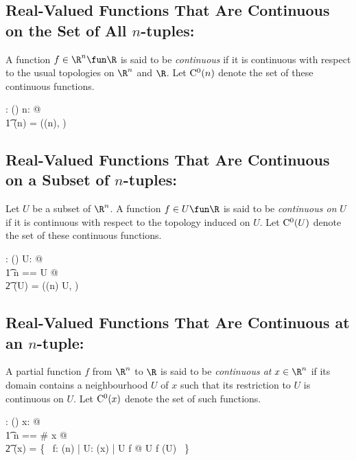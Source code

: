 \documentclass{amsart}
\begin{document}
\subsection{Real-Valued Functions That Are Continuous on the Set of All $n$-tuples: }

A function $f \in \R^n \fun \R$ is said to be \textit{continuous} if it is continuous with respect to the usual topologies
on $\R^n$ and $\R$.
Let $\operatorname{C^0}(n)$ denote the set of these continuous functions.

\begin{axdef}
	\CzeroRtup: \nat \fun \power(\Rinf \pfun \R)
\where
	\forall n: \nat @ \\
	\t1	\CzeroRtup(n) = \CzeroTT(\tsRtup(n), \Rtau)
\end{axdef}

\subsection{Real-Valued Functions That Are Continuous on a Subset of $n$-tuples: }

Let $U$ be a subset of $\R^n$.
A function $f \in U \fun \R$ is said to be \textit{continuous on} $U$
if it is continuous with respect to the topology induced on $U$.
Let $\operatorname{C^0}(U)$ denote the set of these continuous functions.

\begin{axdef}
	\CzeroSubsetRtup: \DeltaRinf \fun \power(\Rinf \pfun \R)
\where
	\forall U: \DeltaRinf @ \\
	\t1	\LET n == \dimRinf U @ \\
	\t2		\CzeroSubsetRtup(U) = \CzeroTT(\tsRtup(n) \inducedTopSp U, \Rtau)
\end{axdef}

\subsection{Real-Valued Functions That Are Continuous at an $n$-tuple: }

A partial function $f$ from $\R^n$ to $\R$ is said to be \textit{continuous at} $x \in \R^n$ if its domain contains a neighbourhood $U$ of $x$
such that its restriction to $U$ is continuous on $U$.
Let $\operatorname{C^0}(x)$ denote the set of such functions.

\begin{axdef}
	\CzeroPointRtup: \Rinf \fun \power(\Rinf \pfun \R)
\where
	\forall x: \Rinf @ \\
	\t1	\LET n == \# x @ \\
	\t2		\CzeroPointRtup(x) = \{~ f: \Rtup(n) \pfun \R | \exists U: \neighRinf(x) | U \subseteq \dom f @ U \dres f \in \CzeroSubsetRtup(U) ~\}
\end{axdef}
\end{document}
